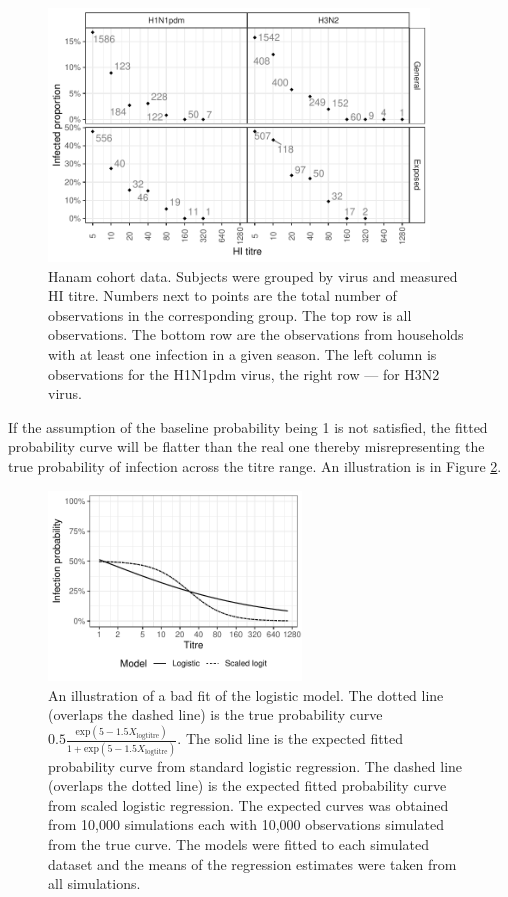 \documentclass[12pt]{article}
\begin{document}
\begin{figure}[htp]
	\centering
	\includegraphics[width=0.9\textwidth]{../data-plot/hanam_counts_light.pdf}
	\caption{
	Hanam cohort data. Subjects were grouped by virus and measured HI titre. Numbers next to points are the total number of observations in the corresponding group. The top row is all observations. The bottom row are the observations from households with at least one infection in a given season. The left column is observations for the H1N1pdm virus, the right row --- for H3N2 virus.
	}
	\label{HanamCounts}
\end{figure}

If the assumption of the baseline probability being 1 is not satisfied, the fitted probability curve will be flatter than the real one thereby misrepresenting the true probability of infection across the titre range. An illustration is in Figure \ref{LogisticFit}.

\pagebreak

\begin{figure}[htp]
	\centering
	\includegraphics[width=0.6\textwidth]{../logistic-plot/lrex.pdf}
	\caption{
	An illustration of a bad fit of the logistic model. The dotted line (overlaps the dashed line) is the true probability curve $0.5\frac{\text{exp}(5 - 1.5 X_{\text{logtitre}})}{1 + \text{exp}(5 - 1.5 X_{\text{logtitre}})}$. The solid line is the expected fitted probability curve from standard logistic regression. The dashed line (overlaps the dotted line) is the expected fitted probability curve from scaled logistic regression. The expected curves was obtained from 10,000 simulations each with 10,000 observations simulated from the true curve. The models were fitted to each simulated dataset and the means of the regression estimates were taken from all simulations.
	}
	\label{LogisticFit}
\end{figure}
\end{document}
